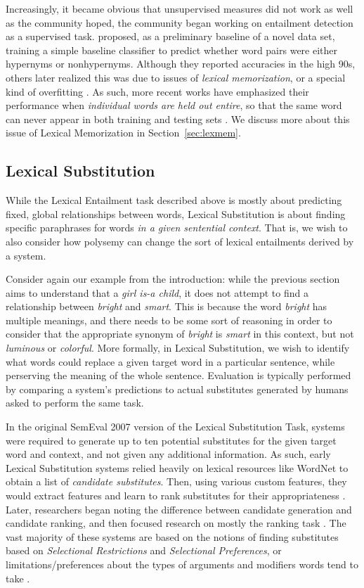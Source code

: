 \documentclass[letterpaper]{article}
\begin{document}
Increasingly, it became obvious that unsupervised measures did not work
as well as the community hoped, the community began working
on entailment detection as a supervised task. 
proposed, as a preliminary baseline of a novel data set, training a simple
baseline classifier to predict whether word pairs were either hypernyms or
nonhypernyms. Although they reported accuracies in the high 90s, others later
realized this was due to issues of {\em lexical memorization}, or a special
kind of overfitting
\cite{roller:2014:coling,weeds:2014:coling,levy:2015:naacl}. As such, more
recent works have emphasized their performance when {\em individual words are
held out entire}, so that the same word can never appear in both training and
testing sets \cite{roller:2014:coling,kruszewski:2015:tacl,levy:2015:naacl}.
We discuss more about this issue of Lexical Memorization in
Section~\ref{sec:lexmem}.

\subsection{Lexical Substitution}

While the Lexical Entailment task described above is mostly about predicting
fixed, global relationships between words, Lexical Substitution is about
finding specific paraphrases for words {\em in a given sentential context}.
That is, we wish to also consider how polysemy can change the sort of
lexical entailments derived by a system.

Consider again our example from the introduction: while the previous section
aims to understand that a {\em girl is-a child}, it does not attempt to find a
relationship between {\em bright} and {\em smart}. This is because the word
{\em bright} has multiple meanings, and there needs to be some sort of
reasoning in order to consider that the appropriate synonym of {\em bright}
is {\em smart} in this context, but not {\em luminous} or {\em colorful}.
More formally, in Lexical Substitution, we wish to identify what
words could replace a given target word in a particular sentence, while
perserving the meaning of the whole sentence. Evaluation is typically
performed by comparing a system's predictions to actual substitutes generated
by humans asked to perform the same task.

In the original SemEval 2007 version of the Lexical Substitution Task, systems
were required to generate up to ten potential substitutes for the given target
word and context, and not given any additional information. As such, early
Lexical Substitution systems relied heavily on lexical resources like WordNet
to obtain a list of {\em candidate substitutes}. Then, using various custom
features, they would extract features and learn to rank substitutes for their
appropriateness \cite{mccarthy:2007:semeval}. Later, researchers began noting
the difference between candidate generation and candidate ranking, and then
focused research on mostly the ranking task \cite{NEEDCITE}. The vast majority
of these systems are based on the notions of finding substitutes based on {\em
Selectional Restrictions} and {\em Selectional Preferences}, or
limitations/preferences about the types of arguments and modifiers words tend
to take \cite{NEEDCITE}.
\end{document}

